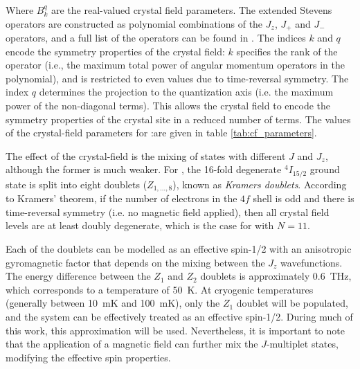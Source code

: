 Where $B_k^q$ are the real-valued crystal field parameters. The extended Stevens operators are constructed as polynomial combinations of the $J_z$, $J_+$ and $J_-$ operators, and a full list of the operators can be found in . The indices $k$ and $q$ encode the symmetry properties of the crystal field: $k$ specifies the rank of the operator (i.e., the maximum total power of angular momentum operators in the polynomial), and is restricted to even values due to time-reversal symmetry. The index $q$ determines the projection to the quantization axis (i.e. the maximum power of the non-diagonal terms). This allows the crystal field to encode the symmetry properties of the crystal site in a reduced number of terms. The values of the crystal-field parameters for \Er:\Ca are given in table \ref{tab:cf_parameters}. 

The effect of the crystal-field is the mixing of states with different $J$ and $J_z$, although the former is much weaker. For \Er, the 16-fold degenerate $^4I_{15/2}$ ground state is split into eight doublets ($Z_{1,\dots,8}$), known as \emph{Kramers doublets}. According to Kramers' theorem,  if the number of electrons in the $4f$ shell is odd and there is time-reversal symmetry (i.e. no magnetic field applied), then all crystal field levels are at least doubly degenerate, which is the case for \Er with $N=11$.

Each of the doublets can be modelled as an effective spin-1/2 with an anisotropic gyromagnetic factor that depends on the mixing between the $J_z$ wavefunctions. The energy difference between the $Z_1$ and $Z_2$ doublets is approximately 0.6~THz, which corresponds to a temperature of 50~K. At cryogenic temperatures (generally between 10~mK and 100~mK), only the $Z_1$ doublet will be populated, and the system can be effectively treated as an effective spin-1/2. During much of this work, this approximation will be used. Nevertheless, it is important to note that the application of a magnetic field can further mix the $J$-multiplet states, modifying the effective spin properties.

